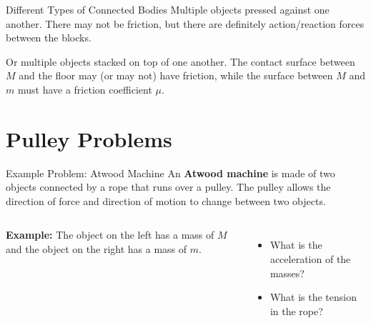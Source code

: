 \documentclass[12pt,compress,aspectratio=169]{beamer}
\begin{document}
\begin{frame}{Different Types of Connected Bodies}
  Multiple objects pressed against one another. There may not be friction, but
  there are definitely action/reaction forces between the blocks.
  \begin{center}
  \end{center}
  Or multiple objects stacked on top of one another. The contact surface between
  $M$ and the floor may (or may not) have friction, while the surface between
  $M$ and $m$ must have a friction coefficient $\mu$.
  \begin{center}
  \end{center}
\end{frame}


\section{Pulley Problems}

\begin{frame}{Example Problem: Atwood Machine}
  An \textbf{Atwood machine} is made of two objects connected by a rope that
  runs over a pulley. The pulley allows the direction of force and direction
  of motion to change between two objects.
  \begin{columns}
    \centering

    \textbf{Example:} The object on the left has a mass of $M$ and the object
    on the right has a mass of $m$.
    \begin{itemize}
    \item What is the acceleration of the masses?
    \item What is the tension in the rope?
    \end{itemize}
  \end{columns}
\end{frame}
\end{document}
